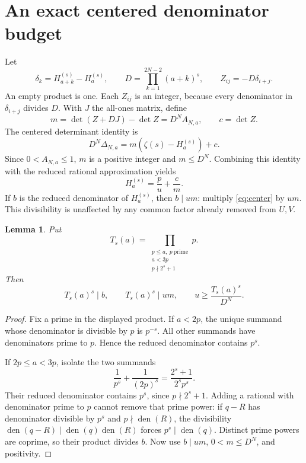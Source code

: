 \documentclass[11pt]{article}
\newtheorem{lemma}[theorem]{Lemma}
\begin{document}
\section{An exact centered denominator budget}
Let
\[
 \delta_k=H_{a+k}^{(s)}-H_a^{(s)},\qquad
 D=\prod_{k=1}^{2N-2}(a+k)^s,\qquad Z_{ij}=-D\delta_{i+j}.
\]
An empty product is one. Each $Z_{ij}$ is an integer, because every
denominator in $\delta_{i+j}$ divides $D$. With $J$ the all-ones matrix,
define
\[
 m=\det(Z+DJ)-\det Z=D^NA_{N,a},\qquad c=\det Z.
\]
The centered determinant identity is
\[
 D^N\Delta_{N,a}=m(\zeta(s)-H_a^{(s)})+c.
\]
Since $0<A_{N,a}\le1$, $m$ is a positive integer and $m\le D^N$.
Combining this identity with the reduced rational approximation yields
\begin{equation}
 H_a^{(s)}=\frac pu+\frac cm.
 \label{eq:center}
\end{equation}
If $b$ is the reduced denominator of $H_a^{(s)}$, then
$b\mid um$: multiply \eqref{eq:center} by $um$.
This divisibility is unaffected by any common factor already removed
from $U,V$.

\begin{lemma}
Put
\[
 T_s(a)=\prod_{\substack{p\le a,\ p\ \mathrm{prime}\\a<3p\\p\nmid 2^s+1}}p.
\]
Then
\begin{equation}
 T_s(a)^s\mid b,\qquad T_s(a)^s\mid um,\qquad
 u\ge\frac{T_s(a)^s}{D^N}.
 \label{eq:primecost}
\end{equation}
\end{lemma}
\begin{proof}
Fix a prime in the displayed product. If $a<2p$, the unique summand
whose denominator is divisible by $p$ is $p^{-s}$. All other summands
have denominators prime to $p$. Hence the reduced denominator contains
$p^s$.

If $2p\le a<3p$, isolate the two summands
\[
 \frac1{p^s}+\frac1{(2p)^s}
 =\frac{2^s+1}{2^s p^s}.
\]
Their reduced denominator contains $p^s$, since $p\nmid2^s+1$.
Adding a rational with denominator prime to $p$ cannot remove that
prime power: if $q-R$ has denominator divisible by $p^s$ and
$p\nmid\operatorname{den}(R)$, the divisibility
$\operatorname{den}(q-R)\mid
 \operatorname{den}(q)\operatorname{den}(R)$ forces
$p^s\mid\operatorname{den}(q)$.
Distinct prime powers are coprime, so their product divides $b$.
Now use $b\mid um$, $0<m\le D^N$, and positivity.
\end{proof}
\end{document}
